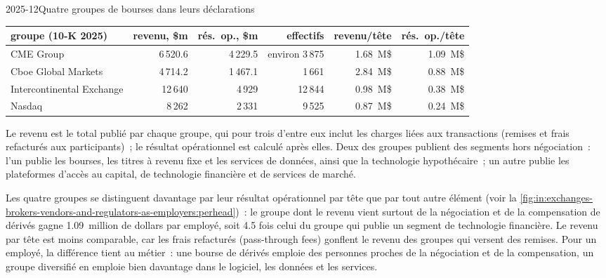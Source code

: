 \begin{dated}{2025-12}{Quatre groupes de bourses dans leurs déclarations}\label{dat:in:exchanges-brokers-vendors-and-regulators-as-employers:exchanges}
\footnotesize
\begin{tabular}{@{}lrrrrr@{}}
\toprule
groupe (10-K 2025) & revenu, \$m & rés.\ op., \$m & effectifs & revenu/tête & rés.\ op./tête\\
\midrule
CME Group & 6\,520.6 & 4\,229.5 & environ 3\,875 & 1.68~M\$ & 1.09~M\$\\
Cboe Global Markets & 4\,714.2 & 1\,467.1 & 1\,661 & 2.84~M\$ & 0.88~M\$\\
Intercontinental Exchange & 12\,640 & 4\,929 & 12\,844 & 0.98~M\$ & 0.38~M\$\\
Nasdaq & 8\,262 & 2\,331 & 9\,525 & 0.87~M\$ & 0.24~M\$\\
\bottomrule
\end{tabular}

\smallskip\noindent Le revenu est le total publié par chaque groupe, qui pour trois d'entre eux inclut les charges liées aux
transactions (remises et frais refacturés aux participants)~; le résultat opérationnel est calculé après elles. Deux des groupes publient des segments hors
négociation~: l'un publie les bourses, les titres à revenu fixe et les services de données, ainsi que la technologie hypothécaire~; un autre
publie les plateformes d'accès au capital, de technologie financière et de services de marché.
\end{dated}

Les quatre groupes se distinguent davantage par leur résultat opérationnel par tête que par tout autre élément
(voir la \cref{fig:in:exchanges-brokers-vendors-and-regulators-as-employers:perhead})~: le groupe dont le revenu vient surtout de la négociation et de la compensation de dérivés gagne
1.09~million de dollars par employé, soit 4.5 fois
celui du groupe qui publie un segment de technologie financière.
Le revenu par tête est moins comparable, car les frais refacturés (pass-through fees) gonflent le revenu des groupes qui versent des remises. Pour un
employé, la différence tient au métier~: une bourse de dérivés emploie des personnes proches de la négociation et de la compensation, un
groupe diversifié en emploie bien davantage dans le logiciel, les données et les services.

